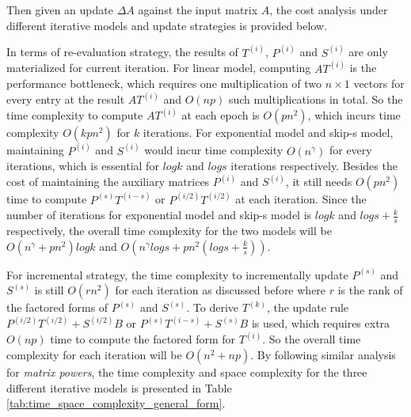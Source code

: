 Then given an update $\Delta A$ against the input matrix $A$, the cost analysis under different iterative models and update strategies is provided below.

In terms of re-evaluation strategy, the results of $T^{(i)}$, $P^{(i)}$ and $S^{(i)}$ are only materialized for current iteration. For linear model, computing $AT^{(i)}$ is the performance bottleneck, which requires one multiplication of two $n \times 1$ vectors for every entry at the result $AT^{(i)}$ and $O(np)$ such multiplications in total. So the time complexity to compute $AT^{(i)}$ at each epoch is $O(pn^2)$, which incurs time complexity $O(kpn^2)$ for $k$ iterations. For exponential model and skip-s model, maintaining $P^{(i)}$ and $S^{(i)}$ would incur time complexity $O(n^{\gamma})$ for every iterations, which is essential for $logk$ and $logs$ iterations respectively. Besides the cost of maintaining the auxiliary matrices $P^{(i)}$ and $S^{(i)}$, it still needs $O(pn^2)$ time to compute $P^{(s)}T^{(i-s)}$ or $P^{(i/2)}T^{(i/2)}$ at each iteration. Since the number of iterations for exponential model and skip-s model is $logk$ and $logs + \frac{k}{s}$ respectively, the overall time complexity for the two models will be $O(n^{\gamma} + pn^2)logk$ and $O(n^{\gamma}logs + pn^2(logs+ \frac{k}{s}))$.

For incremental strategy, the time complexity to incrementally update $P^{(s)}$ and $S^{(s)}$ is still $O(rn^2)$ for each iteration as discussed before where $r$ is the rank of the factored forms of $P^{(s)}$ and $S^{(s)}$. To derive $T^{(k)}$, the update rule $P^{(i/2)}T^{(i/2)} + S^{(i/2)}B$ or $P^{(s)}T^{(i-s)} + S^{(s)}B$ is used, which requires extra $O(np)$ time to compute the factored form for $T^{(i)}$. So the overall time complexity for each iteration will be $O(n^2 + np)$. By following similar analysis for {\em matrix powers}, the time complexity and space complexity for the three different iterative models is presented in Table \ref{tab:time_space_complexity_general_form}.

